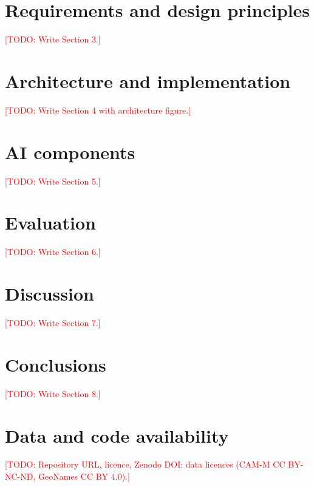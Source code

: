 \documentclass[preprint,12pt,authoryear]{elsarticle}
\newcommand{\todo}[1]{\textcolor{red}{[TODO: #1]}}
\begin{document}
\section{Requirements and design principles}
\label{sec:design}
\todo{Write Section 3.}

\section{Architecture and implementation}
\label{sec:architecture}
\todo{Write Section 4 with architecture figure.}

\section{AI components}
\label{sec:ai}
\todo{Write Section 5.}

\section{Evaluation}
\label{sec:evaluation}
\todo{Write Section 6.}

\section{Discussion}
\label{sec:discussion}
\todo{Write Section 7.}

\section{Conclusions}
\label{sec:conclusions}
\todo{Write Section 8.}

\section*{Data and code availability}
\todo{Repository URL, licence, Zenodo DOI; data licences (CAM-M CC BY-NC-ND, GeoNames CC BY 4.0).}



\end{document}
